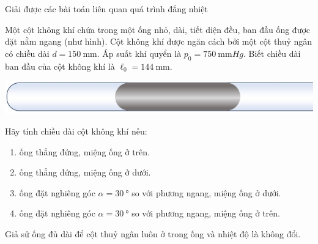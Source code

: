 \begin{dang}{Giải được các bài toán liên quan quá trình đẳng nhiệt}
{Một cột không khí chứa trong một ống nhỏ, dài, tiết diện đều, ban đầu ống được đặt nằm ngang (như hình). Cột không khí được ngăn cách bởi một cột thuỷ ngân có chiều dài $d=\SI{150}{\milli\meter}$. Áp suất khí quyển là $p_0=\SI{750}{\milli\meter Hg}$. Biết chiều dài ban đầu của cột không khí là $\ell_0=\SI{144}{\milli\meter}$.
	\begin{center}
		\includegraphics[width=0.4\linewidth]{../figs/VN12-Y24-PH-SYL-010-3}
	\end{center}
Hãy tính chiều dài cột không khí nếu:
\begin{enumerate}[label=\alph*)]
	\item ống thẳng đứng, miệng ống ở trên.
	\item ống thẳng đứng, miệng ống ở dưới.
	\item ống đặt nghiêng góc $\alpha=\SI{30}{\degree}$ so với phương ngang, miệng ống ở dưới.
	\item ống đặt nghiêng góc $\alpha=\SI{30}{\degree}$ so với phương ngang, miệng ống ở trên.
\end{enumerate}
Giả sử ống đủ dài để cột thuỷ ngân luôn ở trong ống và nhiệt độ là không đổi.
}
{}
\end{dang}
